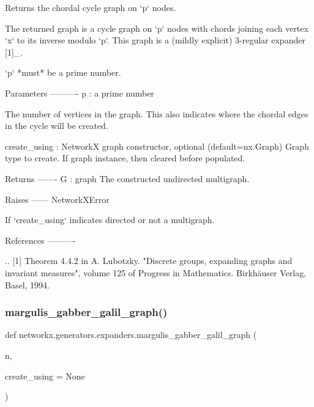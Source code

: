 \begin{DoxyVerb}Returns the chordal cycle graph on `p` nodes.

The returned graph is a cycle graph on `p` nodes with chords joining each
vertex `x` to its inverse modulo `p`. This graph is a (mildly explicit)
3-regular expander [1]_.

`p` *must* be a prime number.

Parameters
----------
p : a prime number

    The number of vertices in the graph. This also indicates where the
    chordal edges in the cycle will be created.

create_using : NetworkX graph constructor, optional (default=nx.Graph)
   Graph type to create. If graph instance, then cleared before populated.

Returns
-------
G : graph
    The constructed undirected multigraph.

Raises
------
NetworkXError

    If `create_using` indicates directed or not a multigraph.

References
----------

.. [1] Theorem 4.4.2 in A. Lubotzky. "Discrete groups, expanding graphs and
       invariant measures", volume 125 of Progress in Mathematics.
       Birkhäuser Verlag, Basel, 1994.\end{DoxyVerb}
 \mbox{\label{namespacenetworkx_1_1generators_1_1expanders_a204030818d78155592a8ff328a5a9b4f}} 
\subsubsection{\texorpdfstring{margulis\+\_\+gabber\+\_\+galil\+\_\+graph()}{margulis\_gabber\_galil\_graph()}}
{\footnotesize\ttfamily def networkx.\+generators.\+expanders.\+margulis\+\_\+gabber\+\_\+galil\+\_\+graph (\begin{DoxyParamCaption}\item[{}]{n,  }\item[{}]{create\+\_\+using = {\ttfamily None} }\end{DoxyParamCaption})}

